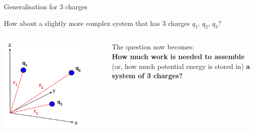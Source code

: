 %
%
%

\begin{frame}{Generalisation for 3 charges}

How about a slightly more complex system that has 3 charges $q_1$, $q_2$, $q_3$?\\
\vspace{0.2cm}

\begin{columns}
  \begin{column}{0.60\textwidth}
   \begin{center}
     \includegraphics[width=0.85\textwidth]{./images/schematics/work_3_charges.png}\\
   \end{center}
  \end{column}
  \begin{column}{0.40\textwidth}
     The question now becomes:\\
     \vspace{0.3cm}
     {\bf How much work is needed to assemble}
     (or, how much potential energy is stored in)
     {\bf a system of 3 charges?}\\
  \end{column}
\end{columns}

\end{frame}

%
%
%

